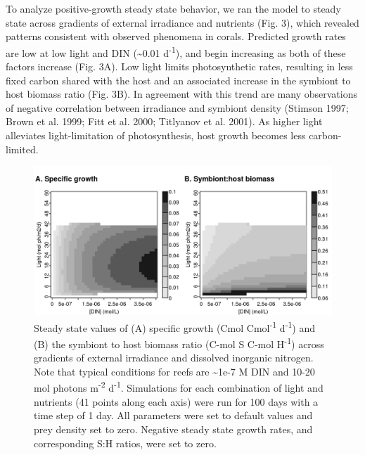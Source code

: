 \documentclass[]{elsarticle} %
\makeatletter
\def\maxwidth{\ifdim\Gin@nat@width>\linewidth\linewidth
\else\Gin@nat@width\fi}
\let\Oldincludegraphics\includegraphics
\renewcommand{\includegraphics}[1]{\Oldincludegraphics[width=\maxwidth]{#1}}
\makeatother
\begin{document}
To analyze positive-growth steady state behavior, we ran the model to
steady state across gradients of external irradiance and nutrients (Fig.
3), which revealed patterns consistent with observed phenomena in
corals. Predicted growth rates are low at low light and DIN
(\textasciitilde{}0.01 d\textsuperscript{-1}), and begin increasing as
both of these factors increase (Fig. 3A). Low light limits
photosynthetic rates, resulting in less fixed carbon shared with the
host and an associated increase in the symbiont to host biomass ratio
(Fig. 3B). In agreement with this trend are many observations of
negative correlation between irradiance and symbiont density (Stimson
1997; Brown et al. 1999; Fitt et al. 2000; Titlyanov et al. 2001). As
higher light alleviates light-limitation of photosynthesis, host growth
becomes less carbon-limited.

\begin{figure}[htbp]
\centering
\includegraphics{../img/Fig3.png}
\caption{Steady state values of (A) specific growth (Cmol
Cmol\textsuperscript{-1} d\textsuperscript{-1}) and (B) the symbiont to
host biomass ratio (C-mol S C-mol H\textsuperscript{-1}) across
gradients of external irradiance and dissolved inorganic nitrogen. Note
that typical conditions for reefs are \textasciitilde{}1e-7 M DIN and
10-20 mol photons m\textsuperscript{-2} d\textsuperscript{-1}.
Simulations for each combination of light and nutrients (41 points along
each axis) were run for 100 days with a time step of 1 day. All
parameters were set to default values and prey density set to zero.
Negative steady state growth rates, and corresponding S:H ratios, were
set to zero.}
\end{figure}
\end{document}
